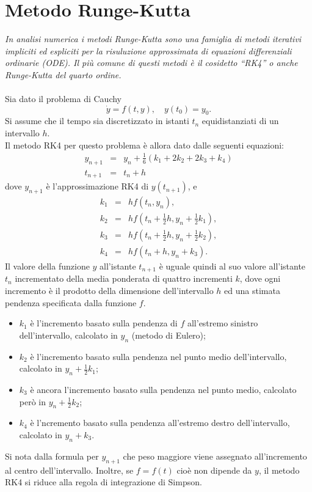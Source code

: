 \chapter{\huge Metodo Runge-Kutta}

\textit{In analisi numerica i metodi Runge-Kutta sono una famiglia di metodi iterativi impliciti ed espliciti per la risuluzione approssimata di equazioni differenziali ordinarie (ODE). Il più comune di questi metodi è il cosidetto ``RK4'' o anche Runge-Kutta del quarto ordine.}
\\\\
Sia dato il problema di Cauchy
$$ \dot y = f(t, y), \quad y(t_0) = y_0.$$
Si assume che il tempo sia discretizzato in istanti $t_n$ equidistanziati di un intervallo $h$.\\
Il metodo RK4 per questo problema è allora dato dalle seguenti equazioni:
\begin{eqnarray*}
y_{n+1} &=& y_n + \tfrac{1}{6} \left(k_1 + 2k_2 + 2k_3 + k_4 \right)\\
t_{n+1} &=& t_n + h
\end{eqnarray*}
dove $y_{n+1}$ è l'approssimazione RK4 di $y(t_{n+1})$, e
\begin{eqnarray*}
k_1 &=& hf(t_n, y_n),\\
k_2 &=& hf(t_n + \tfrac{1}{2}h , y_n + \tfrac{1}{2} k_1),\\
k_3 &=& hf(t_n + \tfrac{1}{2}h , y_n + \tfrac{1}{2} k_2),\\
k_4 &=& hf(t_n + h , y_n + k_3).
\end{eqnarray*}
Il valore della funzione $y$ all'istante $t_{n+1}$ è uguale quindi al suo valore all'istante $t_n$ incrementato della media ponderata di quattro incrementi $k$, dove ogni incremento è il prodotto della dimensione dell'intervallo $h$ ed una stimata pendenza specificata dalla funzione $f$.
\begin{itemize}
\item $k_1$ è l'incremento basato sulla pendenza di $f$ all'estremo sinistro dell'intervallo, calcolato in $y_n$ (metodo di Eulero);
\item $k_2$ è l'incremento basato sulla pendenza nel punto medio dell'intervallo, calcolato in $y_n+\frac{1}{2}k_1$;
\item $k_3$ è ancora l'incremento basato sulla pendenza nel punto medio, calcolato però in $y_n+\frac{1}{2}k_2$;
\item $k_4$ è l'ncremento basato sulla pendenza all'estremo destro dell'intervallo, calcolato in $y_n+k_3$.
\end{itemize}
Si nota dalla formula per $y_{n+1}$ che peso maggiore viene assegnato all'incremento al centro dell'intervallo. Inoltre, se $f=f(t)$ cioè non dipende da $y$, il metodo RK4 si riduce alla regola di integrazione di Simpson.

